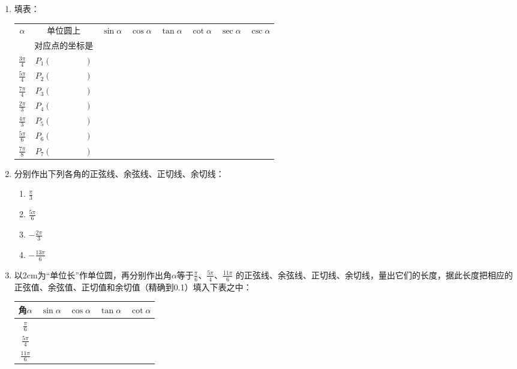 \begin{enumerate}
    \item 填表：
\begin{center}
\begin{tabular}{c|c|c|c|c|c|c|c}
    \hline
$\alpha$ & 单位圆上 &$\sin\alpha$&$\cos\alpha$&$\tan\alpha$&$\cot\alpha$&$\sec\alpha$&$\csc\alpha$\\
&对应点的坐标是&&&&&& \\
\hline
$\frac{3\pi}{4}$ & $P_1(\qquad \qquad )$&&&&&& \\[1.5ex]
$\frac{5\pi}{4}$ & $P_2(\qquad \qquad )$&&&&&& \\[1.5ex]
$\frac{7\pi}{4}$ & $P_3(\qquad \qquad )$&&&&&& \\[1.5ex]
$\frac{2\pi}{3}$ & $P_4(\qquad \qquad )$&&&&&& \\[1.5ex]
$\frac{4\pi}{3}$ & $P_5(\qquad \qquad )$&&&&&& \\[1.5ex]
$\frac{5\pi}{6}$ & $P_6(\qquad \qquad )$&&&&&& \\[1.5ex]
$\frac{7\pi}{8}$ & $P_7(\qquad \qquad )$&&&&&& \\[1.5ex]
\hline
\end{tabular}
\end{center}    

\item 分别作出下列各角的正弦线、余弦线、正切线、余切线：
\begin{multicols}{4}
\begin{enumerate}[(1)]
    \item $\frac{\pi}{3}$
    \item $\frac{5\pi}{6}$
    \item $-\frac{2\pi}{3}$
    \item $-\frac{13\pi}{6}$
\end{enumerate}
\end{multicols}
\item 以2cm为“单位长”作单位圆，再分别作出角$\alpha$等于$\frac{\pi}{6}$、$\frac{5\pi}{4}$、$\frac{11\pi}{6}$
的正弦线、余弦线、正切线、余切线，量出它们的长度，据此长度把相应的正弦值、余弦值、正切值和余切值（精确到0.1）填入下表之中：
\begin{center}
\begin{tabular}{c|c|c|c|c}
\hline
角$\alpha$ & $\sin\alpha$&$\cos\alpha$&$\tan\alpha$&$\cot\alpha$\\
\hline
$\frac{\pi}{6}$ &&&&\\[1.5ex]
$\frac{5\pi}{4}$ &&&&\\[1.5ex]
$\frac{11\pi}{6}$ &&&&\\[1.5ex]
\hline
\end{tabular}
\end{center}
\end{enumerate}

